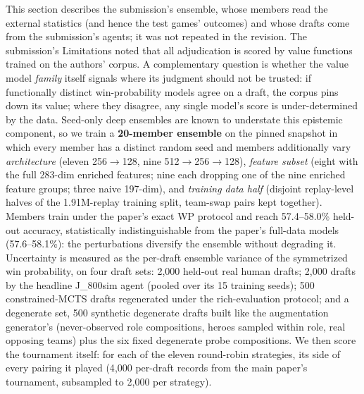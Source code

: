 \documentclass[journal]{IEEEtran}
\newcommand{\added}[1]{{\color{blue}#1}}
\newcommand{\added}[1]{#1}
\begin{document}
\added{This section describes the submission's ensemble, whose members read the external statistics (and hence the test games' outcomes) and whose drafts come from the submission's agents; it was not repeated in the revision.} The submission's Limitations noted that all adjudication is scored by value functions trained on the authors' corpus. A complementary question is whether the value model \textit{family} itself signals where its judgment should not be trusted: if functionally distinct win-probability models agree on a draft, the corpus pins down its value; where they disagree, any single model's score is under-determined by the data. Seed-only deep ensembles are known to understate this epistemic component, so we train a \textbf{20-member ensemble} on the pinned snapshot in which every member has a distinct random seed and members additionally vary \textit{architecture} (eleven 256$\to$128, nine 512$\to$256$\to$128), \textit{feature subset} (eight with the full 283-dim enriched features; nine each dropping one of the nine enriched feature groups; three naive 197-dim), and \textit{training data half} (disjoint replay-level halves of the 1.91M-replay training split, team-swap pairs kept together). Members train under the paper's exact WP protocol and reach 57.4--58.0\% held-out accuracy, statistically indistinguishable from the paper's full-data models (57.6--58.1\%): the perturbations diversify the ensemble without degrading it. Uncertainty is measured as the per-draft ensemble variance of the symmetrized win probability, on four draft sets: 2{,}000 held-out real human drafts; 2{,}000 drafts by the headline J\_800sim agent (pooled over its 15 training seeds); 500 constrained-MCTS drafts regenerated under the rich-evaluation protocol; and a degenerate set, 500 synthetic degenerate drafts built like the augmentation generator's (never-observed role compositions, heroes sampled within role, real opposing teams) plus the six fixed degenerate probe compositions. We then score the tournament itself: for each of the eleven round-robin strategies, its side of every pairing it played (4{,}000 per-draft records from the main paper's tournament, subsampled to 2{,}000 per strategy).
\end{document}
